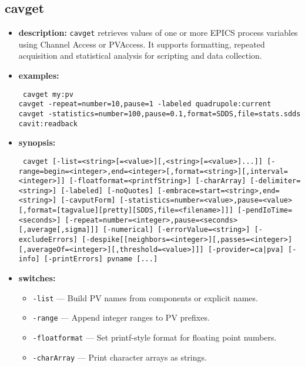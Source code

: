 %
%
\begin{latexonly}
\newpage
\end{latexonly}

\subsection{cavget}
\label{cavget}

\begin{itemize}
\item {\bf description:}
\verb+cavget+ retrieves values of one or more EPICS process variables using Channel Access or PVAccess.
It supports formatting, repeated acquisition and statistical analysis for scripting and data collection.
\item {\bf examples:}
\begin{flushleft}{\tt
cavget my:pv\\
cavget -repeat=number=10,pause=1 -labeled quadrupole:current\\
cavget -statistics=number=100,pause=0.1,format=SDDS,file=stats.sdds cavit:readback
}\end{flushleft}
\item {\bf synopsis:}
\begin{flushleft}{\tt
cavget [-list=<string>[=<value>][,<string>[=<value>]...]]\
[-range=begin=<integer>,end=<integer>[,format=<string>][,interval=<integer>]]\
[-floatformat=<printfString>] [-charArray] [-delimiter=<string>] [-labeled]\
[-noQuotes] [-embrace=start=<string>,end=<string>] [-cavputForm]\
[-statistics=number=<value>,pause=<value>[,format=[tagvalue][pretty][SDDS,file=<filename>]]]\
[-pendIoTime=<seconds>] [-repeat=number=<integer>,pause=<seconds>[,average[,sigma]]]\
[-numerical] [-errorValue=<string>] [-excludeErrors]\
[-despike[[neighbors=<integer>][,passes=<integer>][,averageOf=<integer>][,threshold=<value>]]]\
[-provider={ca|pva}] [-info] [-printErrors] pvname [...]
}\end{flushleft}
\item {\bf switches:}
  \begin{itemize}
    \item {\tt -list} --- Build PV names from components or explicit names.
    \item {\tt -range} --- Append integer ranges to PV prefixes.
    \item {\tt -floatformat} --- Set printf-style format for floating point numbers.
    \item {\tt -charArray} --- Print character arrays as strings.

\end{itemize}
\end{itemize}
